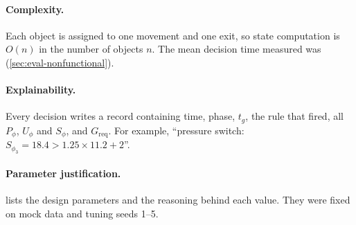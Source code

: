 \paragraph{Complexity.} Each object is assigned to one movement and one exit, so state computation is
$O(n)$ in the number of objects $n$.  The mean decision
time measured was  (\cref{sec:eval-nonfunctional}).

\paragraph{Explainability.} Every decision writes a record containing time, phase, $t_g$, the rule
that fired, all $P_\phi$, $U_\phi$ and $S_\phi$, and $G_{\text{req}}$.  For example, ``pressure switch: $S_{\phi_3} = 18.4 > 1.25 \times
11.2 + 2$''. 

\paragraph{Parameter justification.}  lists the design parameters and the
reasoning behind each value.  They were fixed on mock data and tuning seeds 1--5.

